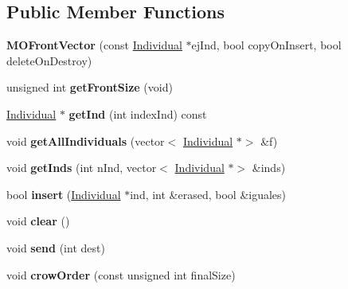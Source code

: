 \subsection*{Public Member Functions}
\begin{DoxyCompactItemize}
\item 
\mbox{\label{classMOFrontVector_a8aa874eec535a01396476660d26d1d92}} 
{\bfseries M\+O\+Front\+Vector} (const \mbox{\hyperlink{classIndividual}{Individual}} $\ast$ej\+Ind, bool copy\+On\+Insert, bool delete\+On\+Destroy)
\item 
\mbox{\label{classMOFrontVector_a097ff296747469de470d1bbe8ffea8d0}} 
unsigned int {\bfseries get\+Front\+Size} (void)
\item 
\mbox{\label{classMOFrontVector_ab3010c5013a5c70bae8d63d28afac7ef}} 
\mbox{\hyperlink{classIndividual}{Individual}} $\ast$ {\bfseries get\+Ind} (int index\+Ind) const
\item 
\mbox{\label{classMOFrontVector_aeb03f858624e260b8cf9e6b258cea16a}} 
void {\bfseries get\+All\+Individuals} (vector$<$ \mbox{\hyperlink{classIndividual}{Individual}} $\ast$$>$ \&f)
\item 
\mbox{\label{classMOFrontVector_afa7bbc5c138b98af007f606973ad44f8}} 
void {\bfseries get\+Inds} (int n\+Ind, vector$<$ \mbox{\hyperlink{classIndividual}{Individual}} $\ast$$>$ \&inds)
\item 
\mbox{\label{classMOFrontVector_af1f3b371e34b724f717e925e8eff9895}} 
bool {\bfseries insert} (\mbox{\hyperlink{classIndividual}{Individual}} $\ast$ind, int \&erased, bool \&iguales)
\item 
\mbox{\label{classMOFrontVector_af953106f10ca1ea2cf4ae9f57071fba8}} 
void {\bfseries clear} ()
\item 
\mbox{\label{classMOFrontVector_a38858522f170894c482bcd3abc57d6b4}} 
void {\bfseries send} (int dest)
\item 
\mbox{\label{classMOFrontVector_a1b62fed1b181930e5ce6ce4b6e792f21}} 
void {\bfseries crow\+Order} (const unsigned int final\+Size)
\end{DoxyCompactItemize}
